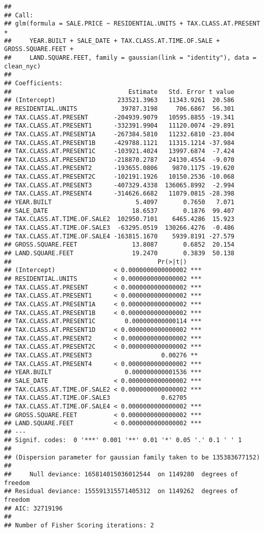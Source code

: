 \documentclass[
]{article}
\begin{document}
\begin{verbatim}
## 
## Call:
## glm(formula = SALE.PRICE ~ RESIDENTIAL.UNITS + TAX.CLASS.AT.PRESENT + 
##     YEAR.BUILT + SALE_DATE + TAX.CLASS.AT.TIME.OF.SALE + GROSS.SQUARE.FEET + 
##     LAND.SQUARE.FEET, family = gaussian(link = "identity"), data = clean_nyc)
## 
## Coefficients:
##                                Estimate   Std. Error t value
## (Intercept)                 233521.3963   11343.9261  20.586
## RESIDENTIAL.UNITS            39787.3198     706.6867  56.301
## TAX.CLASS.AT.PRESENT       -204939.9079   10595.8855 -19.341
## TAX.CLASS.AT.PRESENT1      -332391.9904   11120.0074 -29.891
## TAX.CLASS.AT.PRESENT1A     -267384.5810   11232.6810 -23.804
## TAX.CLASS.AT.PRESENT1B     -429788.1121   11315.1214 -37.984
## TAX.CLASS.AT.PRESENT1C     -103921.4024   13997.6874  -7.424
## TAX.CLASS.AT.PRESENT1D     -218870.2787   24130.4554  -9.070
## TAX.CLASS.AT.PRESENT2      -193655.0806    9870.1175 -19.620
## TAX.CLASS.AT.PRESENT2C     -102191.1926   10150.2536 -10.068
## TAX.CLASS.AT.PRESENT3      -407329.4338  136065.8992  -2.994
## TAX.CLASS.AT.PRESENT4      -314626.6682   11079.0815 -28.398
## YEAR.BUILT                       5.4097       0.7650   7.071
## SALE_DATE                       18.6537       0.1876  99.407
## TAX.CLASS.AT.TIME.OF.SALE2  102950.7101    6465.4286  15.923
## TAX.CLASS.AT.TIME.OF.SALE3  -63295.0519  130266.4276  -0.486
## TAX.CLASS.AT.TIME.OF.SALE4 -163815.1670    5939.8191 -27.579
## GROSS.SQUARE.FEET               13.8087       0.6852  20.154
## LAND.SQUARE.FEET                19.2470       0.3839  50.138
##                                        Pr(>|t|)    
## (Intercept)                < 0.0000000000000002 ***
## RESIDENTIAL.UNITS          < 0.0000000000000002 ***
## TAX.CLASS.AT.PRESENT       < 0.0000000000000002 ***
## TAX.CLASS.AT.PRESENT1      < 0.0000000000000002 ***
## TAX.CLASS.AT.PRESENT1A     < 0.0000000000000002 ***
## TAX.CLASS.AT.PRESENT1B     < 0.0000000000000002 ***
## TAX.CLASS.AT.PRESENT1C        0.000000000000114 ***
## TAX.CLASS.AT.PRESENT1D     < 0.0000000000000002 ***
## TAX.CLASS.AT.PRESENT2      < 0.0000000000000002 ***
## TAX.CLASS.AT.PRESENT2C     < 0.0000000000000002 ***
## TAX.CLASS.AT.PRESENT3                   0.00276 ** 
## TAX.CLASS.AT.PRESENT4      < 0.0000000000000002 ***
## YEAR.BUILT                    0.000000000001536 ***
## SALE_DATE                  < 0.0000000000000002 ***
## TAX.CLASS.AT.TIME.OF.SALE2 < 0.0000000000000002 ***
## TAX.CLASS.AT.TIME.OF.SALE3              0.62705    
## TAX.CLASS.AT.TIME.OF.SALE4 < 0.0000000000000002 ***
## GROSS.SQUARE.FEET          < 0.0000000000000002 ***
## LAND.SQUARE.FEET           < 0.0000000000000002 ***
## ---
## Signif. codes:  0 '***' 0.001 '**' 0.01 '*' 0.05 '.' 0.1 ' ' 1
## 
## (Dispersion parameter for gaussian family taken to be 135383677152)
## 
##     Null deviance: 165814015036012544  on 1149280  degrees of freedom
## Residual deviance: 155591315571405312  on 1149262  degrees of freedom
## AIC: 32719196
## 
## Number of Fisher Scoring iterations: 2
\end{verbatim}
\end{document}
